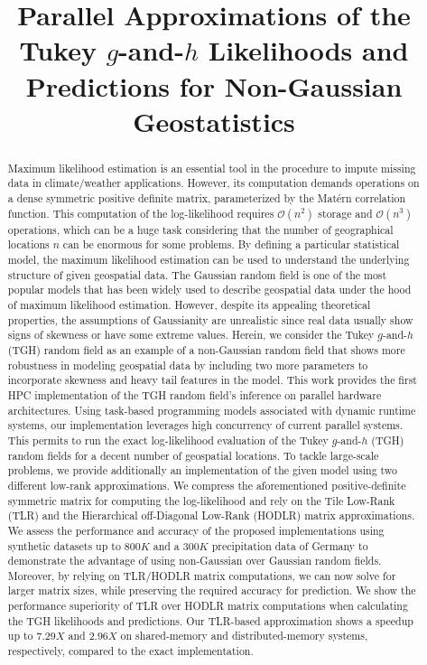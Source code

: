 \documentclass[conference]{IEEEtran}
\begin{document}
\title{Parallel Approximations of the Tukey $g$-and-$h$  Likelihoods and Predictions for Non-Gaussian Geostatistics}




\maketitle

\begin{abstract}

Maximum likelihood estimation is an essential tool in
the procedure to impute missing data in climate/weather
applications. However, its computation demands operations
on a dense symmetric positive definite matrix, parameterized by
the Mat\'ern correlation function. This computation of the log-likelihood requires $\mathcal{O}(n^2)$ storage 
and $\mathcal{O}(n^3)$ operations, which can be a 
huge task considering that the number of geographical 
locations $n$ can be enormous for some problems.  
By defining a particular statistical model, the maximum likelihood estimation can be used to understand the underlying
structure of given geospatial data. The Gaussian random field 
is one of the most popular models that has been widely used 
to describe geospatial data under the hood of maximum likelihood estimation. However, despite its appealing theoretical properties, the assumptions of Gaussianity are unrealistic since real data usually
show signs of skewness or have some extreme values. Herein, we consider the Tukey $g$-and-$h$ (TGH) random field as an example
of a non-Gaussian random field that shows more robustness in modeling geospatial data by including two more parameters 
to incorporate skewness and heavy tail features in the model. 
This work provides the first HPC implementation of the TGH 
random field's inference on parallel hardware architectures. 
Using task-based programming models associated with dynamic runtime systems,
our implementation leverages high concurrency of current parallel systems.
This permits to run the exact log-likelihood evaluation of the Tukey $g$-and-$h$ (TGH) random fields 
for a decent number of geospatial locations.
To tackle large-scale problems, we provide additionally an implementation of the given model 
using two different low-rank approximations. We compress the aforementioned positive-definite symmetric matrix for computing the 
log-likelihood and rely on the Tile Low-Rank (TLR) and the Hierarchical off-Diagonal Low-Rank (HODLR) matrix
approximations. We assess the performance and accuracy of the proposed implementations using synthetic 
datasets up to $800K$ and a $300K$ precipitation data of Germany to demonstrate the advantage 
of using non-Gaussian over Gaussian random fields. Moreover, by relying on TLR/HODLR matrix computations, we 
can now solve for larger matrix sizes, while preserving the required accuracy for prediction. We show
the performance superiority of TLR over HODLR matrix computations when calculating the TGH 
likelihoods and predictions. Our TLR-based approximation shows a 
speedup up to $7.29X$ and $2.96X$ on shared-memory and distributed-memory systems, respectively, compared
to the exact implementation. %
\end{abstract}
\end{document}
